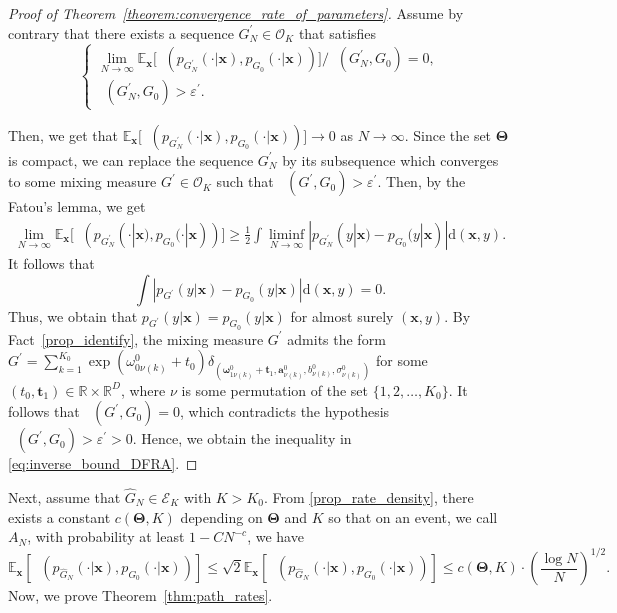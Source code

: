 \documentclass[twoside]{article}
\DeclareMathOperator*{\VDFRA}{D_{FRA}}
\DeclareMathOperator*{\TV}{D_{TV}}
\DeclareMathOperator*{\hels}{D_{h}^2}
\theoremstyle{plain}
\theoremstyle{definition}
\theoremstyle{plain}
\def\rvx{{\mathbf{x}}}
\def\vTheta{{\bm{\Theta}}}
\def\vomega{{\bm{\omega}}}
\def\va{{\bm{a}}}
\def\vt{{\bm{t}}}
\def\vx{{\bm{x}}}
\newcommand{\R}{\mathbb{R}}
\newcommand{\bbE}{\mathbb{E}}
\newcommand{\cE}{\mathcal{E}}
\newcommand{\cO}{\mathcal{O}}
\begin{document}
\begin{proof}[Proof of Theorem~\ref{theorem:convergence_rate_of_parameters}]
Assume by contrary that there exists a sequence $G_{N}^{\prime} \in \cO_K$ that satisfies
$$\begin{cases}
    \lim_{N \to \infty} \bbE_\rvx\big[\TV(p_{G_N^{\prime}}(\cdot|\vx),p_{G_0}(\cdot|\vx))\big]/\VDFRA (G_N^{\prime}, G_0) = 0, \\
    \VDFRA (G_N^{\prime}, G_0) > \varepsilon^{\prime}.
\end{cases}$$

Then, we get that $\bbE_\rvx\big[\TV(p_{G_N^{\prime}}(\cdot|\vx),p_{G_0}(\cdot|\vx))\big] \to 0$ as $N \to \infty$. Since the set $\vTheta$ is compact, we can replace the sequence $G_{N}^{\prime}$ by its subsequence which converges to some mixing measure $G^{\prime} \in \cO_K$ such that $\VDFRA\left(G^{\prime}, G_{0}\right)>\varepsilon^{\prime}$. Then, by the Fatou's lemma, we get
\begin{align}
    \lim_{N \to \infty} \bbE_\rvx\big[\TV(p_{G_N^{\prime}}(\cdot|\vx),p_{G_0}(\cdot|\vx))\big] \ge \frac{1}{2} \int \liminf_{N \to \infty} |p_{G_N^{\prime}}(y|\vx) - p_{G_0}(y|\vx)| \mathrm{d} (\vx, y). \nonumber
\end{align}
It follows that
\[
\int\left|p_{G^{\prime}}(y|\vx)-p_{G_{0}}(y|\vx)\right| \mathrm{d} (\vx, y)=0.
\]
Thus, we obtain that $p_{G^{\prime}}(y|\vx)=p_{G_{0}}(y|\vx)$ for almost surely $(\vx, y)$. By Fact~\ref{prop_identify}, the mixing measure $G^{\prime}$ admits the form $G^{\prime}=\sum_{k=1}^{K_{0}} \exp \left(\omega_{0 \nu(k)}^{0}+t_{0}\right) \delta_{\left(\vomega_{1 \nu(k)}^{0}+\vt_{1}, \va_{\nu(k)}^{0}, b_{\nu(k)}^{0}, \sigma_{\nu(k)}^{0}\right)}$ for some $(t_{0}, \vt_1) \in \R \times \R^D$, where $\nu$ is some permutation of the set $\{1,2, \ldots, K_0\}$. It follows that $\VDFRA\left(G^{\prime}, G_{0}\right)=0$, which contradicts the hypothesis $\VDFRA\left(G^{\prime}, G_{0}\right)>\varepsilon^{\prime}>0$. Hence, we obtain the inequality in \cref{eq:inverse_bound_DFRA}.
\end{proof}

Next, assume that $\widehat{G}_N \in \cE_K$ with $K > K_0$. From \cref{prop_rate_density}, there exists a constant $c(\vTheta, K)$ depending on $\vTheta$ and $K$ so that on an event, we call $A_N$, with probability at least $1 - CN^{-c}$, we have $$\bbE_\rvx[\TV(p_{\widehat{G}_{N}}(\cdot|\vx), p_{G_{0}}(\cdot|\vx))] \leq \sqrt{2}\bbE_\rvx[\hels(p_{\widehat{G}_{N}}(\cdot|\vx), p_{G_{0}}(\cdot|\vx))] \leq c(\vTheta, K) \cdot \left( \frac{\log N}{N} \right)^{1/2}.$$
Now, we prove Theorem~\ref{thm:path_rates}.
\end{document}
